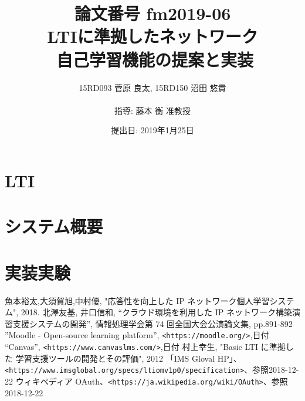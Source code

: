 \documentclass[11pt, a4paper]{jarticle}
\title{\LARGE 論文番号 fm2019-06\\ \Huge LTIに準拠したネットワーク\\自己学習機能の提案と実装}
\author{15RD093 菅原 良太, 15RD150 沼田 悠貴\\ \\指導: 藤本 衡 准教授}
\date{提出日: 2019年1月25日}
\begin{document}
\pagestyle{normal}
\maketitle
\thispagestyle{normal}
\clearpage


\fontsize{11pt}{28pt}\selectfont


\clearpage

\tableofcontents
\clearpage


\clearpage

%

\section{LTI}

%
%
%


\section{システム概要}



\clearpage

\section{実装実験}

\clearpage


\clearpage



\clearpages


\begin{thebibliography}{9999}
   魚本裕太,大須賀旭,中村優, "応答性を向上した
IP ネットワーク個人学習システム", 2018.
   北澤友基, 井口信和, “クラウド環境を利用した IP ネットワーク構築演習支援システムの開発”, 情報処理学会第 74 回全国大会公演論文集, pp.891-892
   ”Moodle - Open-source learning platform”, \texttt{<https://moodle.org/>},日付
   “Canvas”, \texttt{<https://www.canvaslms.com/>},日付
   村上幸生, "Basic LTI に準拠した 学習支援ツールの開発とその評価", 2012
   「IMS Gloval HP」、\texttt{<https://www.imsglobal.org/specs/ltiomv1p0/specification>}、参照2018-12-22
  ウィキペディア OAuth、\texttt{<https://ja.wikipedia.org/wiki/OAuth>}、参照2018-12-22
\end{thebibliography}
\end{document}
